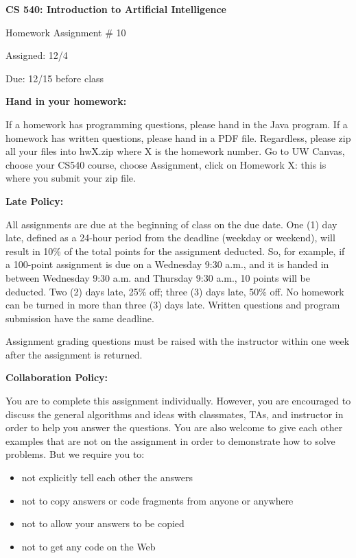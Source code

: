 \documentclass{article}
\begin{document}
\begin{center}
{\bf \large CS 540: Introduction to Artificial Intelligence

Homework Assignment \# 10

\vspace{0.5cm}

Assigned: 12/4 

Due: 12/15 before class} 
\end{center}

\vspace{1cm}

\begin{center}
{\bf \Large Hand in your homework:}
\end{center}

If a homework has programming questions, please hand in the Java program. 
If a homework has written questions, please hand in a PDF file.
Regardless, please zip all your files into hwX.zip where X is the homework number.
Go to UW Canvas, choose your CS540 course, choose Assignment, click on Homework X: this is where you submit your zip file. 

\vspace{1cm}

\begin{center}
{\bf \Large Late Policy:}
\end{center}

All assignments are due at the beginning of class on the due date. One (1) day late, defined as a 24-hour period from the deadline (weekday or weekend), will result in 10\% of the total points for the assignment deducted. So, for example, if a 100-point assignment is due on a Wednesday 9:30 a.m., and it is handed in between Wednesday 9:30 a.m. and Thursday 9:30 a.m., 10 points will be deducted. Two (2) days late, 25\% off; three (3) days late, 50\% off. No homework can be turned in more than three (3) days late. Written questions and program submission have the same deadline. 

Assignment grading questions must be raised with the instructor within one week after the assignment is returned.

\vspace{4pt}

\begin{center}
{\bf \Large Collaboration Policy:}
\end{center}

You are to complete this assignment individually. However, you are encouraged to discuss the general algorithms and ideas with classmates, TAs, and instructor in order to help you answer the questions. You are also welcome to give each other examples that are not on the assignment in order to demonstrate how to solve problems. But we require you to:
\begin{itemize}
\item not explicitly tell each other the answers
\item not to copy answers or code fragments from anyone or anywhere
\item not to allow your answers to be copied
\item not to get any code on the Web
\end{itemize}
\end{document}
